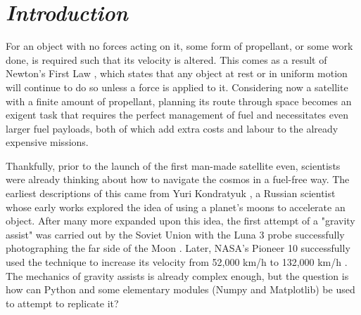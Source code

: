 \documentclass[11pt, english]{report}
\begin{document}
\tableofcontents

\clearpage

\setlength{\cftbeforeloftitleskip}{-22pt}
\renewcommand{\cftloftitlefont}{\hfill\huge\bfseries}
\renewcommand{\cftafterloftitle}{\hfill}
\listoffigures

\clearpage



\cleardoublepage

\chapter{\textsl{Introduction}}
\normalsize{\noindent For an object with no forces acting on it, some form of propellant, or some work done, is required such that its velocity is altered. This comes as a result of Newton's First Law \cite{newton_principia_1999}, which states that any object at rest or in uniform motion will continue to do so unless a force is applied to it. Considering now a satellite with a finite amount of propellant, planning its route through space becomes an exigent task that requires the perfect management of fuel and necessitates even larger fuel payloads, both of which add extra costs and labour to the already expensive missions.

Thankfully, prior to the launch of the first man-made satellite even, scientists were already thinking about how to navigate the cosmos in a fuel-free way. The earliest descriptions of this came from Yuri Kondratyuk \cite{noauthor_kondratuk_nodate}, a Russian scientist whose early works explored the idea of using a planet's moons to accelerate an object. After many more expanded upon this idea, the first attempt of a "gravity assist" was carried out by the Soviet Union with the Luna 3 probe successfully photographing the far side of the Moon \cite{noauthor_luna_nodate}. Later, NASA's Pioneer 10 successfully used the technique to increase its velocity from 52,000 km/h to 132,000 km/h \cite{administrator_pioneer_2015}. The mechanics of gravity assists is already complex enough, but the question is how can Python and some elementary modules (Numpy and Matplotlib) be used to attempt to replicate it?}



%

\end{document}
